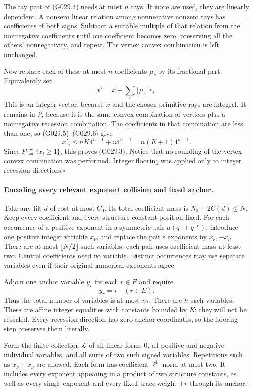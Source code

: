 The ray part of (G029.4) needs at most $n$ rays. If more
are used, they are linearly dependent. A nonzero linear
relation among nonnegative nonzero rays has coefficients
of both signs. Subtract a suitable multiple of that
relation from the nonnegative coefficients until one
coefficient becomes zero, preserving all the others'
nonnegativity, and repeat. The vertex convex combination
is left unchanged.

Now replace each of these at most $n$ coefficients $\mu_s$
by its fractional part. Equivalently set
\[
 x'=x-\sum_s\lfloor\mu_s\rfloor r_s.
\]
This is an integer vector, because $x$ and the chosen
primitive rays are integral. It remains in $P$, because
it is the same convex combination of vertices plus a
nonnegative recession combination. The coefficients in
that combination are less than one, so (G029.5)--(G029.6)
give
\[
 x'_i\le nK4^{n-1}+n4^{n-1}=n(K+1)4^{n-1}.
\]
Since $P\subseteq\{x_i\ge1\}$, this proves (G029.3).
Notice that no rounding of the vertex convex combination
was performed. Integer flooring was applied only to
integer recession directions.\hfill$\square$

\paragraph{Encoding every relevant exponent collision and fixed anchor.}
Take any lift $d$ of cost at most $C_0$. Its total
coefficient mass is $N_0+2C(d)\le N$. Keep every
coefficient and every structure-constant position fixed.
For each occurrence of a positive exponent in a symmetric
pair $a(q^e+q^{-e})$, introduce one positive integer
variable $x_\nu$, and replace the pair's exponents by
$x_\nu,-x_\nu$. There are at most $\lfloor N/2\rfloor$
such variables: each pair uses coefficient mass at least
two. Central coefficients need no variable. Distinct
occurrences may use separate variables even if their
original numerical exponents agree.

Adjoin one anchor variable $y_r$ for each $r\in E$ and require
\[
 y_r=r\quad(r\in E).
\]
Thus the total number of variables is at most $n_*$.
There are $h$ such variables. These are affine integer equalities with constants
bounded by $K$; they will not be rescaled. Every recession
direction has zero anchor coordinates, so the flooring
step preserves them literally.

Form the finite collection $\mathcal L$ of all linear
forms $0$, all positive and negative individual variables,
and all sums of two such signed variables. Repetitions
such as $x_\nu+x_\nu$ are allowed. Each form has coefficient
$\ell^1$ norm at most two. It includes every exponent
appearing in a product of two structure constants,
as well as every single exponent and every fixed trace
weight $\pm r$ through its anchor.

